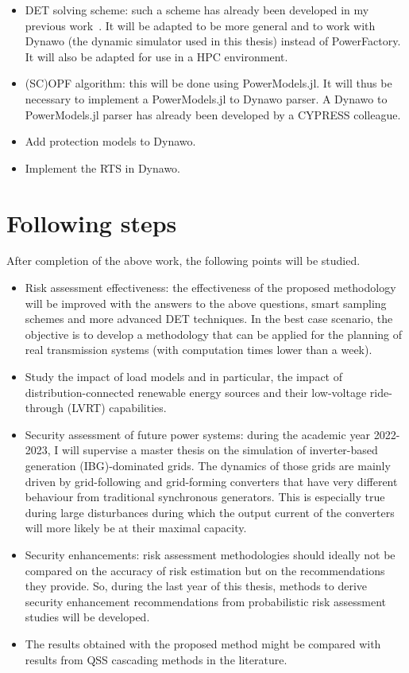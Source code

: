 \begin{itemize}
    \item DET solving scheme: such a scheme has already been developed in my previous work~\cite{MCDETasTool}. It will be adapted to be more general and to work with Dynawo (the dynamic simulator used in this thesis) instead of PowerFactory. It will also be adapted for use in a HPC environment.
    \item (SC)OPF algorithm: this will be done using PowerModels.jl. It will thus be necessary to implement a PowerModels.jl to Dynawo parser. A Dynawo to PowerModels.jl parser has already been developed by a CYPRESS colleague.
    \item Add protection models to Dynawo.
    \item Implement the RTS in Dynawo.
\end{itemize}


\section{Following steps}

After completion of the above work, the following points will be studied.

\begin{itemize}
    \item Risk assessment effectiveness: the effectiveness of the proposed methodology will be improved with the answers to the above questions, smart sampling schemes and more advanced DET techniques. In the best case scenario, the objective is to develop a methodology that can be applied for the planning of real transmission systems (with computation times lower than a week).
    \item Study the impact of load models and in particular, the impact of distribution-connected renewable energy sources and their low-voltage ride-through (LVRT) capabilities.
    \item Security assessment of future power systems: during the academic year 2022-2023, I will supervise a master thesis on the simulation of inverter-based generation (IBG)-dominated grids. The dynamics of those grids are mainly driven by grid-following and grid-forming converters that have very different behaviour from traditional synchronous generators. This is especially true during large disturbances during which the output current of the converters will more likely be at their maximal capacity.
    \item Security enhancements: risk assessment methodologies should ideally not be compared on the accuracy of risk estimation but on the recommendations they provide. So, during the last year of this thesis, methods to derive security enhancement recommendations from probabilistic risk assessment studies will be developed.
    \item The results obtained with the proposed method might be compared with results from QSS cascading methods in the literature.
\end{itemize}


